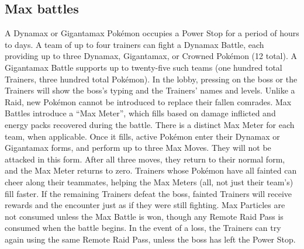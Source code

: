 \subsection{Max battles\label{sec:maxbattles}}
A Dynamax or Gigantamax Pokémon occupies a Power Stop for a period of hours to days.
A team of up to four trainers can fight a Dynamax Battle, each providing up to
  three Dynamax, Gigantamax, or Crowned Pokémon (12 total).
A Gigantamax Battle supports up to twenty-five such teams (one hundred total Trainers, three hundred total Pokémon).
In the lobby, pressing on the boss or the Trainers will show the boss's typing and the Trainers'
 names and levels.
Unlike a Raid, new Pokémon cannot be introduced to replace their fallen comrades.
Max Battles introduce a ``Max Meter'', which fills based on damage inflicted and
  energy packs recovered during the battle.
There is a distinct Max Meter for each team, when applicable.
Once it fills, active Pokémon enter their Dynamax or Gigantamax forms, and perform
  up to three Max Moves.
They will not be attacked in this form.
After all three moves, they return to their normal form, and the Max Meter returns to zero.
Trainers whose Pokémon have all fainted can cheer along their teammates,
  helping the Max Meters (all, not just their team's) fill faster.
If the remaining Trainers defeat the boss, fainted Trainers will
 receive rewards and the encounter just as if they were still fighting.
Max Particles are not consumed unless the Max Battle is won, though any Remote Raid Pass
 is consumed when the battle begins.
In the event of a loss, the Trainers can try again using the same Remote Raid Pass,
 unless the boss has left the Power Stop.

